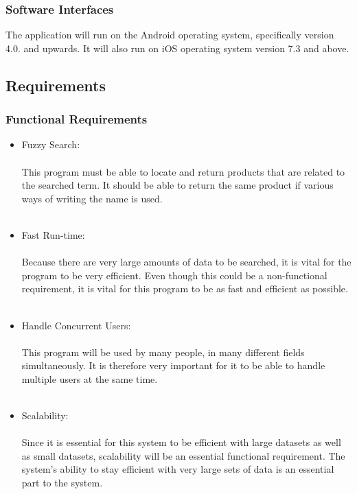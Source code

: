 \documentclass[a4paper,10pt]{article}
\begin{document}
{                 \subsubsection{Software Interfaces}
The application will run on the Android operating system, specifically version 4.0. and upwards. It will also run on iOS operating system version 7.3 and above.

	\subsection{Requirements}
	\subsubsection{Functional Requirements} 
		\begin{itemize}
		\item Fuzzy Search:\\\\
			This program must be able to locate and return products that are related to the searched term. It should be able to return the same product if various ways of writing the name is used.\\\\
	
		\item Fast Run-time:\\\\
			Because there are very large amounts of data to be searched, it is vital for the program to be very efficient.  Even though this could be a non-functional requirement, it is vital for this program to be as fast and efficient as possible.\\\\
	
		\item Handle Concurrent Users:\\\\
			This program will be used by many people, in many different fields simultaneously. It is therefore very important for it to be able to handle multiple users at the same time.\\\\
	
		\item Scalability:\\\\
			Since it is essential for this system to be efficient with large datasets as well as small datasets, scalability will be an essential functional requirement. The system’s ability to stay efficient with very large sets of data is an essential part to the system.
		 \end{itemize}

}
\end{document}
